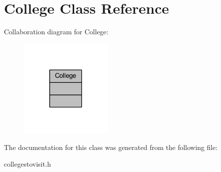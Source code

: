 \hypertarget{class_college}{}\section{College Class Reference}
\label{class_college}


Collaboration diagram for College\+:\nopagebreak
\begin{figure}[H]
\begin{center}
\leavevmode
\includegraphics[width=129pt]{class_college__coll__graph}
\end{center}
\end{figure}


The documentation for this class was generated from the following file\+:\begin{DoxyCompactItemize}
\item 
collegestovisit.\+h\end{DoxyCompactItemize}
